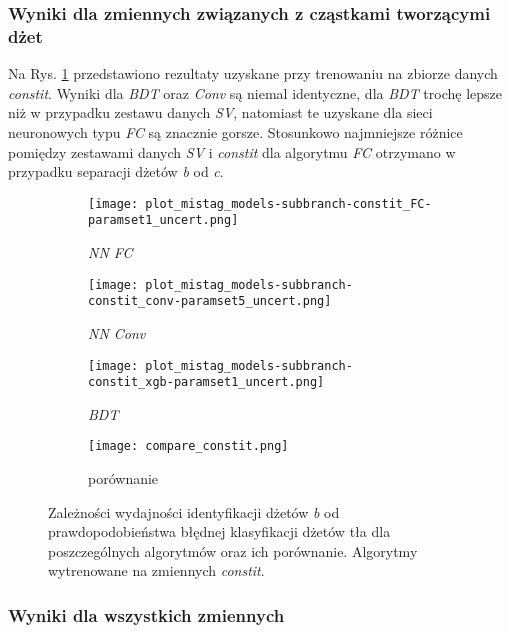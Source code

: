 \clearpage
\FloatBarrier
\subsubsection{Wyniki dla zmiennych związanych z cząstkami tworzącymi dżet}

Na Rys. \ref{fig:ROC_constit} przedstawiono rezultaty uzyskane przy trenowaniu na zbiorze danych \textit{constit}. Wyniki dla \textit{BDT} oraz \textit{Conv} są niemal identyczne, dla \textit{BDT} trochę lepsze niż w przypadku zestawu danych \textit{SV}, natomiast te uzyskane dla sieci neuronowych typu \textit{FC} są znacznie gorsze. Stosunkowo najmniejsze różnice pomiędzy zestawami danych \textit{SV} i \textit{constit} dla algorytmu \textit{FC} otrzymano w przypadku separacji dżetów \textit{b} od \textit{c}.

\begin{figure}[ht]
	\centering
	
    \begin{subfigure}[b]{0.49\textwidth}
	\texttt{[image: plot\_mistag\_models-subbranch-constit\_FC-paramset1\_uncert.png]}
	\caption{\textit{NN FC}}
	\end{subfigure}
    \begin{subfigure}[b]{0.49\textwidth}
	\texttt{[image: plot\_mistag\_models-subbranch-constit\_conv-paramset5\_uncert.png]}	
	\caption{\textit{NN Conv}}
	\end{subfigure}
    \begin{subfigure}[b]{0.49\textwidth}
	\texttt{[image: plot\_mistag\_models-subbranch-constit\_xgb-paramset1\_uncert.png]}
	\caption{\textit{BDT}}
	\end{subfigure}
	\begin{subfigure}[b]{0.49\textwidth}
	\texttt{[image: compare\_constit.png]}
	\caption{porównanie}
	\end{subfigure}
	
	\caption{Zależności wydajności identyfikacji dżetów \textit{b} od prawdopodobieństwa błędnej klasyfikacji dżetów tła dla poszczególnych algorytmów oraz ich porównanie. Algorytmy wytrenowane na zmiennych \textit{constit}.}
	\label{fig:ROC_constit}
\end{figure}

\clearpage
\FloatBarrier
\subsubsection{Wyniki dla wszystkich zmiennych}

